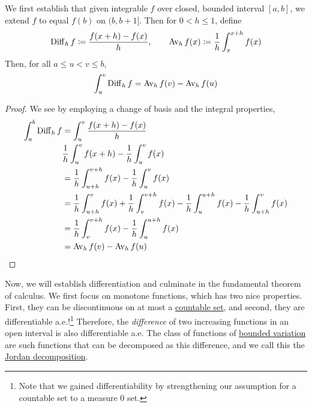   \begin{lemma}
    \label{thm:Change-of-Variable}
    We first establish that given integrable $f$ over closed, bounded interval $[a, b]$, we extend $f$ to equal $f(b)$ on $(b, b +1]$. Then for $0 < h \leq 1$, define 
    \begin{equation}
      \operatorname{Diff}_h f \coloneqq \frac{f(x + h) - f(x)}{h}, \qquad \operatorname{Av}_h f(x) \coloneqq \frac{1}{h} \int_{x}^{x + h} f(x)
    \end{equation}
    Then, for all $a \leq u < v \leq b$, 
    \begin{equation}
      \int_u^v \operatorname{Diff}_h f = \operatorname{Av}_h f(v) - \operatorname{Av}_h f(u)
    \end{equation}
  \end{lemma}
  \begin{proof}
    We see by employing a change of basis and the integral properties, 
    \begin{align}
      \int_a^b \operatorname{Diff}_h f & = \int_u^v \frac{f(x + h) - f(x)}{h} \\ 
                         & \frac{1}{h} \int_u^v f(x + h) - \frac{1}{h} \int_u^v f(x) \\ 
                         & = \frac{1}{h} \int_{u+h}^{v+h} f(x) -  \frac{1}{h} \int_u^v f(x) \\ 
                         & = \frac{1}{h} \int_{u+h}^{v} f(x) + \frac{1}{h} \int_{v}^{v+h} f(x) -  \frac{1}{h} \int_u^{u+h} f(x) - \frac{1}{h} \int_{u+h}^v f(x) \\ 
                         & = \frac{1}{h} \int_{v}^{v+h} f(x) -  \frac{1}{h} \int_u^{u+h} f(x) \\ 
                         & = \operatorname{Av}_h f(v) - \operatorname{Av}_h f(u)
    \end{align}
  \end{proof}

  Now, we will establish differentiation and culminate in the fundamental theorem of calculus. 
  We first focus on monotone functions, which has two nice properties. First, they can be discontinuous on at most a \hyperref[st-def:countable]{countable set}, and second, they are differentiable a.e.!\footnote{Note that we gained differentiability by strengthening our assumption for a countable set to a measure 0 set.} Therefore, the \textit{difference} of two increasing functions in an open interval is also differentiable a.e. The class of functions of \hyperref[def:bounded-variation]{bounded variation} are such functions that can be decomposed as this difference, and we call this the \hyperref[thm:jordan-decomposition-theorem]{Jordan decomposition}. 

